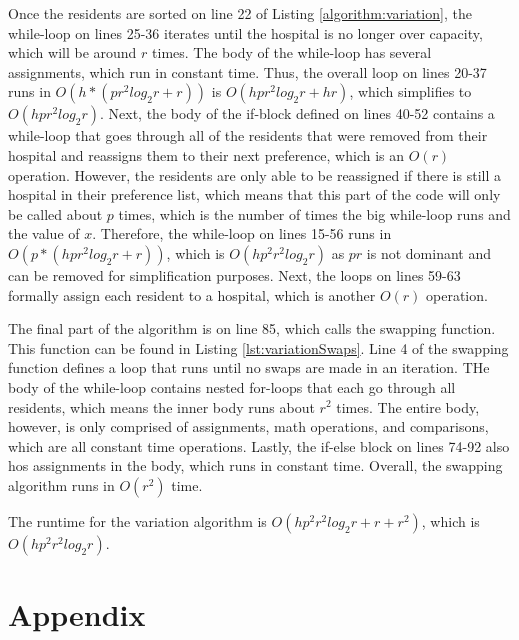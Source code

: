 \documentclass[letterpaper, 10pt,DIV=13]{scrartcl}
\numberwithin{equation}{section} %
\numberwithin{figure}{section} %
\numberwithin{table}{section} %
\begin{document}
Once the residents are sorted on line 22 of Listing \ref{algorithm:variation}, the while-loop on lines 25-36 iterates until the hospital is no longer over capacity, which will be around $r$ times. The body of the while-loop has several assignments, which run in constant time. Thus, the overall loop on lines 20-37 runs in $O(h * (pr^2log_2r + r))$ is $O(hpr^2log_2r + hr)$, which simplifies to $O(hpr^2log_2r)$. Next, the body of the if-block defined on lines 40-52 contains a while-loop that goes through all of the residents that were removed from their hospital and reassigns them to their next preference, which is an $O(r)$ operation. However, the residents are only able to be reassigned if there is still a hospital in their preference list, which means that this part of the code will only be called about $p$ times, which is the number of times the big while-loop runs and the value of $x$. Therefore, the while-loop on lines 15-56 runs in $O(p *(hpr^2log_2r + r))$, which is $O(hp^2r^2log_2r)$ as $pr$ is not dominant and can be removed for simplification purposes. Next, the loops on lines 59-63 formally assign each resident to a hospital, which is another $O(r)$ operation.

The final part of the algorithm is on line 85, which calls the swapping function. This function can be found in Listing \ref{lst:variationSwaps}. Line 4 of the swapping function defines a loop that runs until no swaps are made in an iteration. THe body of the while-loop contains nested for-loops that each go through all residents, which means the inner body runs about $r^2$ times. The entire body, however, is only comprised of assignments, math operations, and comparisons, which are all constant time operations. Lastly, the if-else block on lines 74-92 also hos assignments in the body, which runs in constant time. Overall, the swapping algorithm runs in $O(r^2)$ time.

The runtime for the variation algorithm is $O(hp^2r^2log_2r + r + r^2)$, which is $O(hp^2r^2log_2r)$.

\section{Appendix}
\lstset{numbers=left, numberstyle=\tiny, stepnumber=1, numbersep=5pt}

\end{document}
